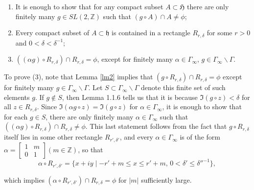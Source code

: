\documentclass[12pt]{article} %
\begin{document}
\begin{enumerate}
  \item It is enough to show that for any compact subset $A \subset \mathfrak{H}$ there are only finitely many $g \in SL(2, \mathbb{Z})$ such that $(g \circ A) \cap A \neq \phi$;

  \item Every compact subset of $A \subset \mathfrak{h}$ is contained in a rectangle $R_{r,\delta}$ for some $r > 0$ and $0 < \delta < \delta^{-1}$;

  \item $((\alpha g) \circ R_{r,\delta}) \cap R_{r,\delta} = \phi$, except for finitely many $\alpha \in \Gamma_{\infty}$, $g \in \Gamma_{\infty}\backslash \Gamma$.
\end{enumerate}

To prove (3), note that Lemma \ref{lm2} implies that $(g \circ R_{r,\delta}) \cap R_{r,\delta} = \phi$ except for finitely many $g \in \Gamma_{\infty}\backslash \Gamma$. Let $S \subset \Gamma_{\infty}\backslash \Gamma$ denote this finite set of such elements $g$. If $g \not\in S$, then Lemma 1.1.6 tells us that it is because $\Im(g \circ z) < \delta$ for all $z \in R_{r,\delta}$. Since $\Im(\alpha g \circ z) = \Im(g \circ z)$ for $\alpha \in \Gamma_{\infty}$, it is enough to show that for each $g \in S$, there are only finitely many $\alpha \in \Gamma_{\infty}$ such that $((\alpha g) \circ R_{r,\delta}) \cap R_{r,\delta} \neq \phi$. This last statement follows from the fact that $g \circ R_{r,\delta}$ itself lies in some other rectangle $R_{r',\delta'}$, and every $\alpha \in \Gamma_{\infty}$ is of the form $\alpha =
  \begin{bmatrix}
    1 & m \\
    0 & 1
  \end{bmatrix}
  (m \in \mathbb{Z})$, so that
\[
  \alpha \circ R_{r',\delta'} = \{x + iy \mid -r' + m \leq x \leq r' + m, \, 0 < \delta' \leq \delta''^{-1}\},
\]

which implies $(\alpha \circ R_{r',\delta'}) \cap R_{r,\delta} = \phi$ for $|m|$ sufficiently large.
\end{document}
